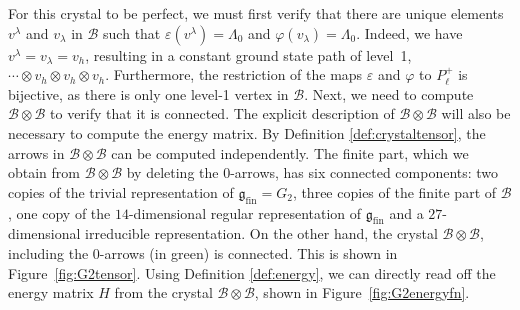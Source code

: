 \documentclass[10pt,a4paper]{amsart}
\numberwithin{equation}{section}
\theoremstyle{definition}
\begin{document}
For this crystal to be perfect, we must first verify that there are unique elements $v^\lambda$ and $v_\lambda$ in $\mathcal{B}$ such that $\varepsilon(v^\lambda) = \Lambda_0$ and $\varphi(v_\lambda) = \Lambda_0$. Indeed, we have $v^\lambda = v_\lambda = v_h$, resulting in a constant ground state path of level~1, $\cdots\otimes v_h\otimes v_h\otimes v_h$. Furthermore, the restriction of the maps $\varepsilon$ and $\varphi$ to $P_\ell^+$ is bijective, as there is only one level-1 vertex in $\mathcal{B}$. Next, we need to compute $\mathcal{B} \otimes \mathcal{B}$ to verify that it is connected. The explicit description of $\mathcal{B} \otimes \mathcal{B}$ will also be necessary to compute the energy matrix. By Definition \ref{def:crystaltensor}, the arrows in $\mathcal{B} \otimes \mathcal{B}$ can be computed independently. The finite part, which we obtain from $\mathcal{B} \otimes \mathcal{B}$ by deleting the $0$-arrows, has six connected components: two copies of the trivial representation of $\mathfrak{g}_\mathrm{fin} = G_2$, three copies of the finite part of $\mathcal{B}$, one copy of the $14$-dimensional regular representation of $\mathfrak{g}_\mathrm{fin}$ and a $27$-dimensional irreducible representation. On the other hand, the crystal $\mathcal{B}\otimes\mathcal{B}$, including the 0-arrows (in green) is connected. This is shown in Figure~\ref{fig:G2tensor}. Using Definition \ref{def:energy}, we can directly read off the energy matrix $H$ from the crystal $\mathcal{B} \otimes \mathcal{B}$, shown in Figure~\ref{fig:G2energyfn}.
\end{document}
